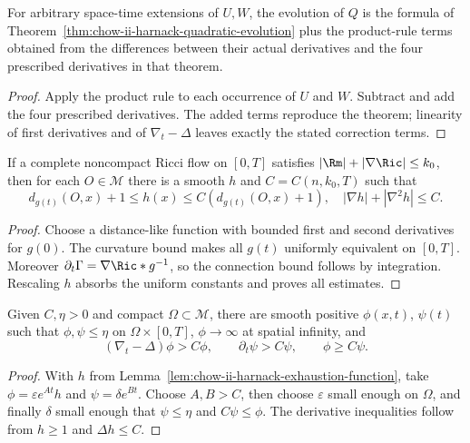 \begin{example}
\label{ex:chow-ii-unconstrained-harnack-quadratic-evolution}
For arbitrary space-time extensions of \(U,W\), the evolution of \(Q\) is the
formula of Theorem~\ref{thm:chow-ii-harnack-quadratic-evolution} plus the
product-rule terms obtained from the differences between their actual
derivatives and the four prescribed derivatives in that theorem.
\end{example}
\begin{proof}
\sketch Apply the product rule to each occurrence of \(U\) and \(W\).  Subtract and
add the four prescribed derivatives.  The added terms reproduce the theorem;
linearity of first derivatives and of \(\nabla_t-\Delta\) leaves exactly the
stated correction terms.
\end{proof}

\begin{lemma}
\label{lem:chow-ii-harnack-exhaustion-function}
If a complete noncompact Ricci flow on \([0,T]\) satisfies
\(|\Rm|+|\nabla\Ric|\le k_0\), then for each \(O\in\mathcal M\) there is a
smooth \(h\) and \(C=C(n,k_0,T)\) such that
\[
d_{g(t)}(O,x)+1\le h(x)\le C(d_{g(t)}(O,x)+1),
\quad |\nabla h|+|\nabla^2h|\le C.
\]
\end{lemma}
\begin{proof}
\sketch Choose a distance-like function with bounded first and second derivatives for
\(g(0)\).  The curvature bound makes all \(g(t)\) uniformly equivalent on
\([0,T]\).  Moreover \(\partial_t\Gamma=\nabla\Ric* g^{-1}\), so the
connection bound follows by integration.  Rescaling \(h\) absorbs the uniform
constants and proves all estimates.
\end{proof}

\begin{lemma}
\label{lem:chow-ii-harnack-barrier-functions}
Given \(C,\eta>0\) and compact \(\Omega\subset\mathcal M\), there are smooth
positive \(\phi(x,t)\), \(\psi(t)\) such that \(\phi,\psi\le\eta\) on
\(\Omega\times[0,T]\), \(\phi\to\infty\) at spatial infinity, and
\[
(\nabla_t-\Delta)\phi>C\phi,\qquad \partial_t\psi>C\psi,
\qquad \phi\ge C\psi.
\]
\end{lemma}
\begin{proof}
\sketch With \(h\) from Lemma~\ref{lem:chow-ii-harnack-exhaustion-function}, take
\(\phi=\varepsilon e^{At}h\) and \(\psi=\delta e^{Bt}\).  Choose
\(A,B>C\), then choose \(\varepsilon\) small enough on \(\Omega\), and
finally \(\delta\) small enough that \(\psi\le\eta\) and
\(C\psi\le\phi\).  The derivative inequalities follow from
\(h\ge1\) and \(\Delta h\le C\).
\end{proof}

